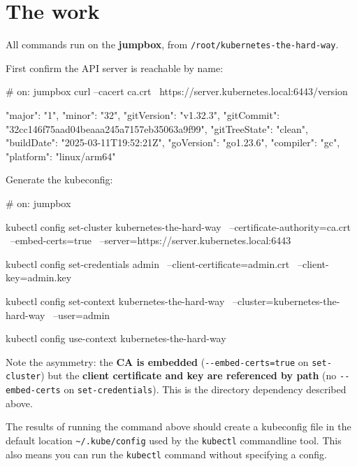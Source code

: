 \documentclass[11pt,oneside]{report}
\begin{document}
\hypertarget{the-work-9}{%
\section{The
work}\label{the-work-9}}

All commands run on
the
\textbf{jumpbox},
from
\texttt{/}\allowbreak{}\texttt{root/}\allowbreak{}\texttt{kubernetes-}\allowbreak{}\texttt{the-}\allowbreak{}\texttt{hard-}\allowbreak{}\texttt{way}.

First confirm the
API server is
reachable by name:

\begin{cmdlst}
# on: jumpbox
curl --cacert ca.crt \
  https://server.kubernetes.local:6443/version
\end{cmdlst}

\begin{outlst}
{
  "major": "1",
  "minor": "32",
  "gitVersion": "v1.32.3",
  "gitCommit": "32cc146f75aad04beaaa245a7157eb35063a9f99",
  "gitTreeState": "clean",
  "buildDate": "2025-03-11T19:52:21Z",
  "goVersion": "go1.23.6",
  "compiler": "gc",
  "platform": "linux/arm64"
}
\end{outlst}

Generate the
kubeconfig:

\begin{cmdlst}
# on: jumpbox
{
  kubectl config set-cluster kubernetes-the-hard-way \
    --certificate-authority=ca.crt \
    --embed-certs=true \
    --server=https://server.kubernetes.local:6443

  kubectl config set-credentials admin \
    --client-certificate=admin.crt \
    --client-key=admin.key

  kubectl config set-context kubernetes-the-hard-way \
    --cluster=kubernetes-the-hard-way \
    --user=admin

  kubectl config use-context kubernetes-the-hard-way
}
\end{cmdlst}

Note the asymmetry:
the \textbf{CA is
embedded}
(\texttt{-\/-embed-}\allowbreak{}\texttt{certs=true}
on
\texttt{set-cluster})
but the
\textbf{client
certificate and key
are referenced by
path} (no
\texttt{-\/-embed-certs}
on
\texttt{set-credentials}).
This is the
directory dependency
described above.

The results of
running the command
above should create
a kubeconfig file in
the default location
\texttt{\textasciitilde{}/.kube/config}
used by the
\texttt{kubectl}
commandline tool.
This also means you
can run the
\texttt{kubectl}
command without
specifying a config.
\end{document}
